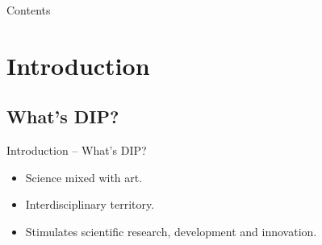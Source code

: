 





\begin{frame}
\titlepage %
\end{frame}


\begin{frame}{Contents}
\setcounter{tocdepth}{1}
\tableofcontents
\end{frame}




\section{Introduction}


\subsection{What's DIP?}


\begin{frame}{Introduction -- What's DIP?}
\begin{itemize}
\item Science mixed with art.
\item Interdisciplinary territory.
\item Stimulates scientific research, development and innovation.
\end{itemize}
\end{frame}


%
%

